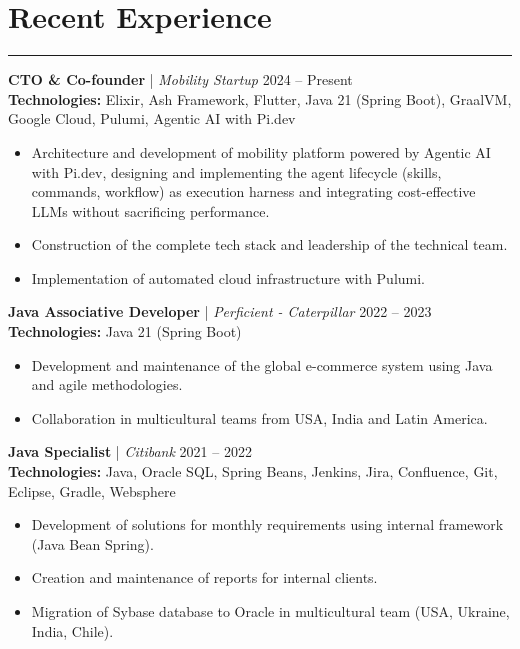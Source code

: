 \documentclass[11pt,a4paper]{article}
\begin{document}
\section*{Recent Experience}
\hrule
\vspace{8pt}
\textbf{CTO \& Co-founder} | \textit{Mobility Startup} \hfill 2024 -- Present \\
\textbf{Technologies:} Elixir, Ash Framework, Flutter, Java 21 (Spring Boot), GraalVM, Google Cloud, Pulumi, Agentic AI with Pi.dev \\
\begin{itemize}[noitemsep, topsep=0pt]
    \item Architecture and development of mobility platform powered by Agentic AI with Pi.dev, designing and implementing the agent lifecycle (skills, commands, workflow) as execution harness and integrating cost-effective LLMs without sacrificing performance.
    \item Construction of the complete tech stack and leadership of the technical team.
    \item Implementation of automated cloud infrastructure with Pulumi.
\end{itemize}
\vspace{8pt}
\textbf{Java Associative Developer} | \textit{Perficient - Caterpillar} \hfill 2022 -- 2023 \\
\textbf{Technologies:} Java 21 (Spring Boot) \\
\begin{itemize}[noitemsep, topsep=0pt]
    \item Development and maintenance of the global e-commerce system using Java and agile methodologies.
    \item Collaboration in multicultural teams from USA, India and Latin America.
\end{itemize}
\vspace{8pt}
\textbf{Java Specialist} | \textit{Citibank} \hfill 2021 -- 2022 \\
\textbf{Technologies:} Java, Oracle SQL, Spring Beans, Jenkins, Jira, Confluence, Git, Eclipse, Gradle, Websphere \\
\begin{itemize}[noitemsep, topsep=0pt]
    \item Development of solutions for monthly requirements using internal framework (Java Bean Spring).
    \item Creation and maintenance of reports for internal clients.
    \item Migration of Sybase database to Oracle in multicultural team (USA, Ukraine, India, Chile).
\end{itemize}
\end{document}
